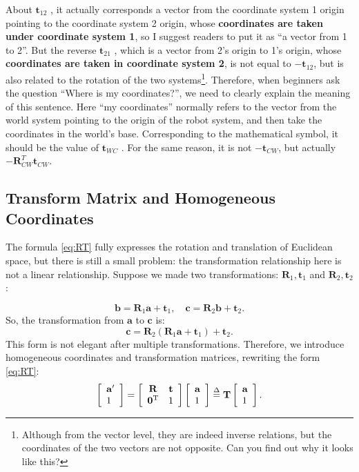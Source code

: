 About $\mathbf{t}_{12}$ , it actually corresponds a vector from the coordinate system 1 origin pointing to the coordinate system 2 origin, whose \textbf{coordinates are taken under coordinate system 1}, so I suggest readers to put it as ``a vector from 1 to 2''. But the reverse $ \mathbf{t}_{21} $ , which is a vector from 2's origin to 1's origin, whose \textbf{coordinates are taken in coordinate system 2}, is not equal to $-\mathbf{t}_{12}$, but is also related to the rotation of the two systems\footnote{Although from the vector level, they are indeed inverse relations, but the coordinates of the two vectors are not opposite. Can you find out why it looks like this? }. Therefore, when beginners ask the question ``Where is my coordinates?'', we need to clearly explain the meaning of this sentence. Here ``my coordinates'' normally refers to the vector from the world system pointing to the origin of the robot system, and then take the coordinates in the world's base. Corresponding to the mathematical symbol, it should be the value of $ \mathbf{t}_{WC} $ . For the same reason, it is not $ - \mathbf {t}_{CW}$, but actually $-\mathbf{R}_{CW}^T \mathbf{t}_{CW}$.

\subsection{Transform Matrix and Homogeneous Coordinates}
The formula \eqref{eq:RT} fully expresses the rotation and translation of Euclidean space, but there is still a small problem: the transformation relationship here is not a linear relationship. Suppose we made two transformations: $ \mathbf {R}_ 1 , \mathbf {t}_ 1 $ and $ \mathbf {R}_ 2 , \mathbf {t}_ 2 $:

\[
\mathbf{b} = {\mathbf{R}_1} \mathbf{a} + {\mathbf{t}_1}, \quad \mathbf{c} = {\mathbf{R}_2} \mathbf{b} + {\mathbf{t}_2}.
\]
So, the transformation from $ \mathbf{a} $ to $ \mathbf{c} $ is:
\[
\mathbf{c} = {\mathbf{R}_2}\left( {{\mathbf{R}_1} \mathbf{a} + {\mathbf{t}_1}} \right) + {\mathbf{t}_2}.
\]
This form is not elegant after multiple transformations. Therefore, we introduce homogeneous coordinates and transformation matrices, rewriting the form \eqref{eq:RT}:
\begin{equation}
\left[\begin{array}{l} 
\mathbf {a} ' \\
1
\end{array} \right] = 
\left[ {\begin{array}{*{20}{c}}
    \mathbf{R}&\mathbf{t}\\
    {{\mathbf{0}^\mathrm{T}}}&1
    \end{array}} \right]
\left[ \begin{array}{l}
\mathbf {a} \\
1
\end{array} \right]  \buildrel \Delta \over = \mathbf{T} \left[ \begin{array}{l}
\mathbf {a} \\
1
\end{array} \right].
\end{equation}

